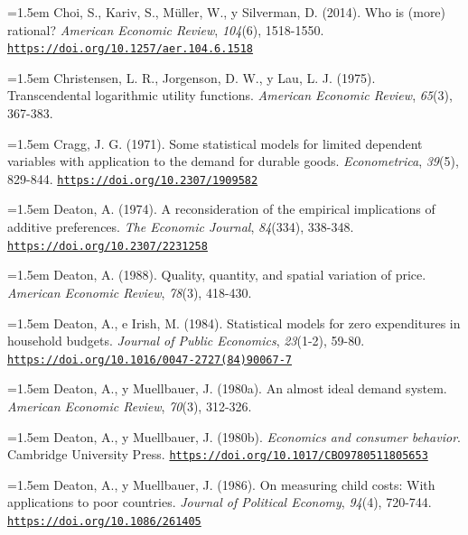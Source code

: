 \documentclass[10pt,a4paper]{article}
\begin{document}
\noindent\hangindent=1.5em Choi, S., Kariv, S., Müller, W., y Silverman, D. (2014). Who is (more) rational? \textit{American Economic Review}, \textit{104}(6), 1518-1550. \href{https://doi.org/10.1257/aer.104.6.1518}{\nolinkurl{https://doi.org/10.1257/aer.104.6.1518}}

\noindent\hangindent=1.5em Christensen, L. R., Jorgenson, D. W., y Lau, L. J. (1975). Transcendental logarithmic utility functions. \textit{American Economic Review}, \textit{65}(3), 367-383.

\noindent\hangindent=1.5em Cragg, J. G. (1971). Some statistical models for limited dependent variables with application to the demand for durable goods. \textit{Econometrica}, \textit{39}(5), 829-844. \href{https://doi.org/10.2307/1909582}{\nolinkurl{https://doi.org/10.2307/1909582}}

\noindent\hangindent=1.5em Deaton, A. (1974). A reconsideration of the empirical implications of additive preferences. \textit{The Economic Journal}, \textit{84}(334), 338-348. \href{https://doi.org/10.2307/2231258}{\nolinkurl{https://doi.org/10.2307/2231258}}

\noindent\hangindent=1.5em Deaton, A. (1988). Quality, quantity, and spatial variation of price. \textit{American Economic Review}, \textit{78}(3), 418-430.

\noindent\hangindent=1.5em Deaton, A., e Irish, M. (1984). Statistical models for zero expenditures in household budgets. \textit{Journal of Public Economics}, \textit{23}(1-2), 59-80. \href{https://doi.org/10.1016/0047-2727(84)90067-7}{\nolinkurl{https://doi.org/10.1016/0047-2727(84)90067-7}}

\noindent\hangindent=1.5em Deaton, A., y Muellbauer, J. (1980a). An almost ideal demand system. \textit{American Economic Review}, \textit{70}(3), 312-326.

\noindent\hangindent=1.5em Deaton, A., y Muellbauer, J. (1980b). \textit{Economics and consumer behavior}. Cambridge University Press. \href{https://doi.org/10.1017/CBO9780511805653}{\nolinkurl{https://doi.org/10.1017/CBO9780511805653}}

\noindent\hangindent=1.5em Deaton, A., y Muellbauer, J. (1986). On measuring child costs: With applications to poor countries. \textit{Journal of Political Economy}, \textit{94}(4), 720-744. \href{https://doi.org/10.1086/261405}{\nolinkurl{https://doi.org/10.1086/261405}}
\end{document}
